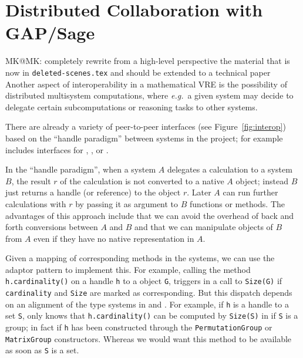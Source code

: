 \section{Distributed Collaboration with GAP/Sage}\label{sec:gapsage}
\label{sec:handles}

\begin{newpart}{MK@MK: completely rewrite from a high-level perspective the material that
    is now in \texttt{deleted-scenes.tex} and should be extended to a technical paper}
Another aspect of interoperability in a mathematical VRE is the possibility of distributed
multisystem computations, where \emph{e.g.}\ a given system may decide to delegate
certain subcomputations or reasoning tasks to other systems.

There are already a variety of peer-to-peer interfaces (see Figure~\ref{fig:interop})
based on the ``handle paradigm'' between systems in the \ODK project;
for example \Sage includes interfaces for \GAP, \Singular, or \Pari.

In the ``handle paradigm'', when a system $A$ delegates a calculation to a system $B$, the
result $r$ of the calculation is not converted to a native $A$ object; instead $B$ just
returns a handle (or reference) to the object $r$. Later $A$ can run further calculations
with $r$ by passing it as argument to $B$ functions or methods. The advantages of this
approach include that we can avoid the overhead of back and forth conversions between $A$
and $B$ and that we can manipulate objects of $B$ from $A$ even if they have no native
representation in $A$.

Given a mapping of corresponding methods in the systems, we can use the adaptor pattern to
implement this. For example, calling the method \texttt{h.cardinality()} on a \Sage handle
\texttt{h} to a \GAP object \texttt{G}, triggers in \GAP a call to \texttt{Size(G)} if
\texttt{cardinality} and \texttt{Size} are marked as corresponding. But this dispatch
depends on an alignment of the type systems in \Sage and \GAP. For example, if \texttt{h}
is a handle to a set \texttt{S}, \Sage only knows that \texttt{h.cardinality()} can be
computed by \texttt{Size(S)} in \GAP if \texttt{S} is a group; in fact if \texttt{h} has
been constructed through the \texttt{PermutationGroup} or \texttt{MatrixGroup}
constructors. Whereas we would want this method to be available as soon as \texttt{S} is a
set.


\end{newpart}
